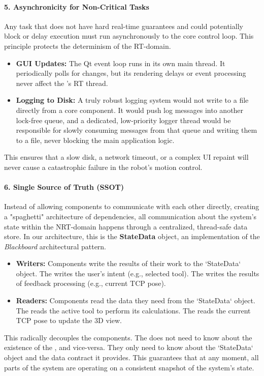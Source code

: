 \paragraph{5. Asynchronicity for Non-Critical Tasks}
Any task that does not have hard real-time guarantees and could potentially block or delay execution must run asynchronously to the core control loop. This principle protects the determinism of the RT-domain.
\begin{itemize}
    \item \textbf{GUI Updates:} The Qt event loop runs in its own main thread. It periodically polls  for changes, but its rendering delays or event processing never affect the 's RT thread.
    \item \textbf{Logging to Disk:} A truly robust logging system would not write to a file directly from a core component. It would push log messages into another lock-free queue, and a dedicated, low-priority logger thread would be responsible for slowly consuming messages from that queue and writing them to a file, never blocking the main application logic.
\end{itemize}
This ensures that a slow disk, a network timeout, or a complex UI repaint will never cause a catastrophic failure in the robot's motion control.


\paragraph{6. Single Source of Truth (SSOT)}
Instead of allowing components to communicate with each other directly, creating a "spaghetti" architecture of dependencies, all communication about the system's state within the NRT-domain happens through a centralized, thread-safe data store. In our architecture, this is the \textbf{StateData} object, an implementation of the \textit{Blackboard} architectural pattern.
\begin{itemize}
    \item \textbf{Writers:} Components write the results of their work to the `StateData` object. The  writes the user's intent (e.g., selected tool). The  writes the results of feedback processing (e.g., current TCP pose).
    \item \textbf{Readers:} Components read the data they need from the `StateData` object. The  reads the active tool to perform its calculations. The  reads the current TCP pose to update the 3D view.
\end{itemize}
This radically decouples the components. The  does not need to know about the existence of the , and vice-versa. They only need to know about the `StateData` object and the data contract it provides. This guarantees that at any moment, all parts of the system are operating on a consistent snapshot of the system's state.

